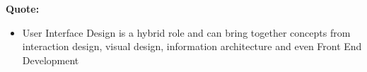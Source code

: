\textbf{Quote:}

\begin{itemize}
\item User Interface Design is a hybrid role and can bring together concepts from interaction design, visual design, information architecture and even Front End Development
\end{itemize}

